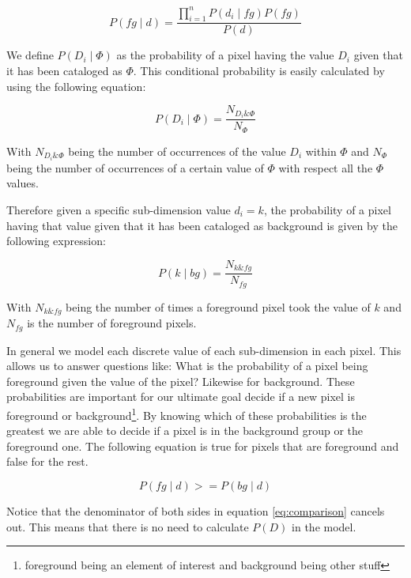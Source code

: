 \documentclass[a4paper,12pt]{report}
\begin{document}
\begin{equation}
P(fg \mid d) = \frac{\prod_{i=1}^n{P(d_i \mid fg)} P(fg)}{P(d)}
\end{equation}

We define $P(D_i \mid \Phi)$ as the probability of a pixel having the value $D_i$
given that it has been cataloged as $\Phi$. This conditional probability is
easily calculated by using the following equation:

\begin{equation}\label{eq:dimgivenphi}
P(D_i \mid \Phi) = \frac{N_{D_i\&\Phi}}{N_{\Phi}}
\end{equation}

With $N_{D_i\&\Phi}$ being the number of occurrences of the value $D_i$ within
$\Phi$ and $N_{\Phi}$ being the number of occurrences of a certain value of
$\Phi$ with respect all the $\Phi$ values.

Therefore given a specific sub-dimension value $d_i=k$, the probability of a
pixel having that value given that it has been cataloged as background is given
by the following expression:

\begin{equation}
P(k \mid bg) = \frac{N_{k\&fg}}{N_{fg}}
\end{equation}

With $N_{k\&fg}$ being the number of times a foreground pixel took the value of
$k$ and $N_{fg}$ is the number of foreground pixels.

In general we model each discrete value of each sub-dimension in
each pixel. This allows us to answer questions like: What is the probability of
a pixel being foreground given the value of the pixel? Likewise for background.
These probabilities are important for our ultimate goal decide if a new pixel
is foreground or background\footnote{foreground being an element of interest
and background being other stuff}. By knowing which of these probabilities is
the greatest we are able to decide if a pixel is in the background group or the
foreground one. The following equation is true for pixels that are foreground
and false for the rest.

\begin{equation}\label{eq:comparison}
P(fg \mid d) >= P(bg \mid d)
\end{equation}

Notice that the denominator of both sides in equation \ref{eq:comparison}
cancels out. This means that there is no need to calculate $P(D)$ in the model.
\end{document}
